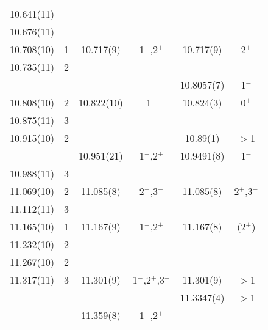 \begin{center}
\begin{longtable}{cc cc cc}
     10.641(11)   &          &                  &                     &             &                 \\
     10.676(11)   &          &                  &                     &             &                 \\
     10.708(10)   & 1        &  10.717(9)       & 1$^-$,2$^+$         & 10.717(9)   &  2$^+$          \\
     10.735(11)   & 2        &                  &                     &             &                 \\
                  &          &                  &                     & 10.8057(7)  &  1$^-$          \\
     10.808(10)   & 2        &  10.822(10)      &   1$^-$             & 10.824(3)   &  0$^+$          \\
     10.875(11)   & 3        &                  &                     &             &                 \\
      10.915(10)  & 2        &                  &                     & 10.89(1)    &  $>$1           \\
                  &          &  10.951(21)      &  1$^-$,2$^+$        & 10.9491(8)  &  1$^-$          \\
   10.988(11)     & 3        &                  &                     &             &                 \\
    11.069(10)    & 2        &  11.085(8)       &  2$^+$,3$^-$        & 11.085(8)   &  2$^+$,3$^- $   \\
     11.112(11)   & 3        &                  &                     &             &                 \\
    11.165(10)    & 1        &  11.167(9)       &  1$^-$,2$^+$        & 11.167(8)   &  (2$^+$)        \\
    11.232(10)    & 2        &                  &                     &             &                 \\
    11.267(10)    & 2        &                  &                     &             &                 \\
    11.317(11)    & 3        &  11.301(9)       &  1$^-$,2$^+$,3$^-$  & 11.301(9)   &  $>$1           \\
                  &          &                  &                     & 11.3347(4)  &  $>$1           \\
                  &          &  11.359(8)       &  1$^-$,2$^+$        &             &                 \\

\end{longtable}
\end{center}
